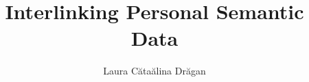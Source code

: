 \documentclass{hepthesis}
\title{Interlinking Personal Semantic Data}
\author{Laura C\u{a}ta\u{a}lina Dr\u{a}gan}
\begin{document}
\begin{frontmatter}
 
\end{frontmatter}

\begin{mainmatter}
 
 
 
 
\end{mainmatter}

\begin{appendices}
 
\end{appendices}



\end{document}
